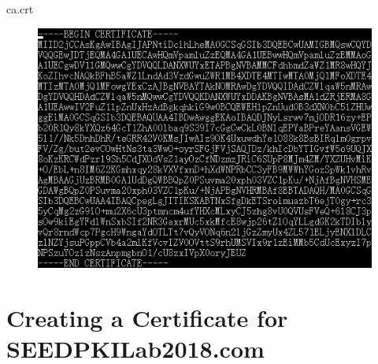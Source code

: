\documentclass{article}
\begin{document}
ca.crt
\begin{figure}[H]\centering\includegraphics{1-3.png}\end{figure}

\section{Creating a Certificate for SEEDPKILab2018.com}
\end{document}
